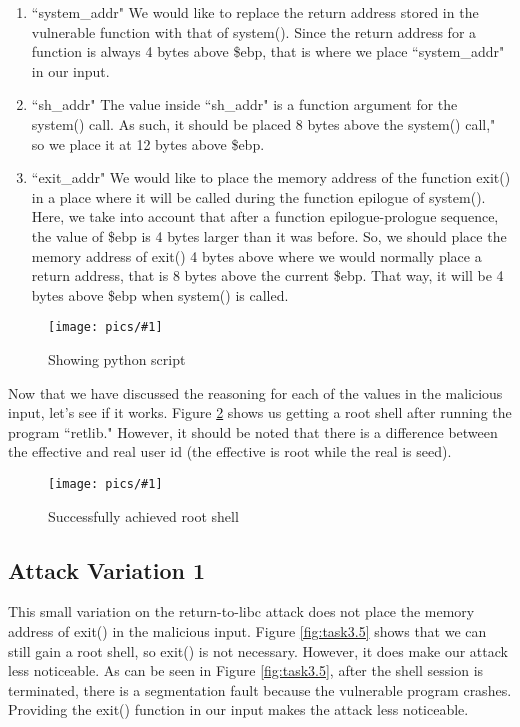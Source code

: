 \documentclass[11pt]{article}
\newcommand{\fig}[2]{ 
\begin{figure}[h]
	\centering
	\caption{#2}
	\texttt{[image: pics/\#1]}
	\label{fig:#1}
\end{figure} 
}
\begin{document}
\begin{enumerate}
	\item ``system\_addr" We would like to replace the return address stored in the vulnerable function with that of system(). Since the return address for a function is always 4 bytes above \$ebp, that is where we place ``system\_addr" in our input.
	\item ``sh\_addr" The value inside ``sh\_addr" is a function argument for the system() call. As such, it should be placed 8 bytes above the system() call," so we place it at 12 bytes above \$ebp.
	\item ``exit\_addr" We would like to place the memory address of the function exit() in a place where it will be called during the function epilogue of system(). Here, we take into account that after a function epilogue-prologue sequence, the value of \$ebp is 4 bytes larger than it was before. So, we should place the memory address of exit() 4 bytes above where we would normally place a return address, that is 8 bytes above the current \$ebp. That way, it will be 4 bytes above \$ebp when system() is called. 
\end{enumerate}

\fig{task3.3}{Showing python script}

Now that we have discussed the reasoning for each of the values in the malicious input, let's see if it works. Figure \ref{fig:task3.4} shows us getting a root shell after running the program ``retlib." However, it should be noted that there is a difference between the effective and real user id (the effective is root while the real is seed).

\fig{task3.4}{Successfully achieved root shell}

\newpage

\subsection*{Attack Variation 1}

This small variation on the return-to-libc attack does not place the memory address of exit() in the malicious input. Figure \ref{fig:task3.5} shows that we can still gain a root shell, so exit() is not necessary. However, it does make our attack less noticeable. As can be seen in Figure \ref{fig:task3.5}, after the shell session is terminated, there is a segmentation fault because the vulnerable program crashes. Providing the exit() function in our input makes the attack less noticeable.
\end{document}
